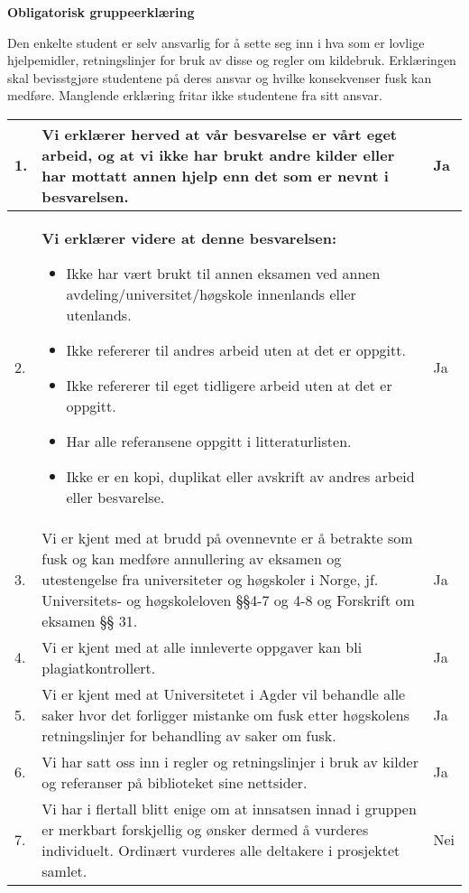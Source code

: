 

\large{\bf{Obligatorisk gruppeerklæring}} \\

{\small {}
Den enkelte student er selv ansvarlig for å sette seg inn i hva som er lovlige hjelpemidler, retningslinjer for bruk av disse og regler om kildebruk. Erklæringen skal bevisstgjøre studentene på deres ansvar og hvilke konsekvenser fusk kan medføre. Manglende erklæring fritar ikke studentene fra sitt ansvar.\\

\begin{center}
\begin{tabular}{ |p{1cm}|p{11.5cm}|p{1cm}|}
 \hline  
 
 1. & Vi erklærer herved at vår besvarelse er vårt eget arbeid, og at vi ikke har brukt andre kilder eller har mottatt annen hjelp enn det som er nevnt i besvarelsen. & Ja \\
 \hline
 2. & \textbf{Vi erklærer videre at denne besvarelsen:}
 \begin{itemize}
    \item Ikke har vært brukt til annen eksamen ved annen avdeling/universitet/høgskole innenlands eller utenlands.
    \item Ikke refererer til andres arbeid uten at det er oppgitt.
    \item Ikke refererer til eget tidligere arbeid uten at det er oppgitt.
    \item Har alle referansene oppgitt i litteraturlisten.
    \item Ikke er en kopi, duplikat eller avskrift av andres arbeid eller besvarelse.
 \end{itemize}& Ja \\
 \hline
 3. & Vi er kjent med at brudd på ovennevnte er å betrakte som fusk og kan medføre annullering av eksamen og utestengelse fra universiteter og høgskoler i Norge, jf. Universitets- og høgskoleloven §§4-7 og 4-8 og Forskrift om eksamen §§ 31.
 & Ja  \\
 \hline
 4. & Vi er kjent med at alle innleverte oppgaver kan bli plagiatkontrollert.
 & Ja  \\
 \hline
 5. & Vi er kjent med at Universitetet i Agder vil behandle alle saker hvor det forligger mistanke om fusk etter høgskolens retningslinjer for behandling av saker om fusk.
 & Ja  \\
 \hline
 6. & Vi har satt oss inn i regler og retningslinjer i bruk av kilder og referanser på biblioteket sine nettsider.
 & Ja \\
 \hline
 7. & Vi har i flertall blitt enige om at innsatsen innad i gruppen er merkbart forskjellig og ønsker dermed å vurderes individuelt.
Ordinært vurderes alle deltakere i prosjektet samlet.
 & Nei \\
 \hline
\end{tabular}
\end{center}}

